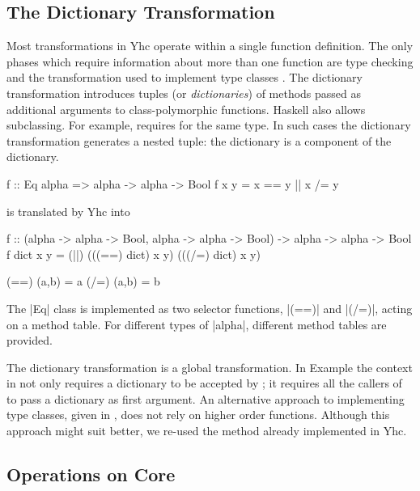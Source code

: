\subsection{The Dictionary Transformation}
\label{sec:dict}

Most transformations in Yhc operate within a single function definition. The only phases which require information about more than one function are type checking and the transformation used to implement type classes \citep{wadler:type_classes}. The dictionary transformation introduces tuples (or \textit{dictionaries}) of methods passed as additional arguments to class-polymorphic functions. Haskell also allows subclassing. For example,  requires  for the same type. In such cases the dictionary transformation generates a nested tuple: the  dictionary is a component of the  dictionary.

\begin{example}
\nopagebreak
\ignore\begin{code}
f :: Eq alpha => alpha -> alpha -> Bool
f x y = x == y || x /= y
\end{code}

\noindent is translated by Yhc into

\begin{code}
f :: (alpha -> alpha -> Bool, alpha -> alpha -> Bool) -> alpha -> alpha -> Bool
f dict x y = (||) (((==) dict) x y) (((/=) dict) x y)

(==) (a,b) = a
(/=) (a,b) = b
\end{code}

The |Eq| class is implemented as two selector functions, |(==)| and |(/=)|, acting on a method table. For different types of |alpha|, different method tables are provided.
\end{example}

The dictionary transformation is a global transformation. In Example \lastexample{} the  context in  not only requires a dictionary to be accepted by ; it requires all the callers of  to pass a dictionary as first argument. An alternative approach to implementing type classes, given in \citet{jones:dictionary_free}, does not rely on higher order functions. Although this approach might suit \catch{} better, we re-used the method already implemented in Yhc.

\subsection{Operations on Core}

